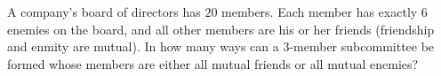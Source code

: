 A company's board of directors has $20$ members. Each member has exactly $6$ enemies on the board, and all other members are his or her friends (friendship and enmity are mutual). In how many ways can a $3$-member subcommittee be formed whose members are either all mutual friends or all mutual enemies?
